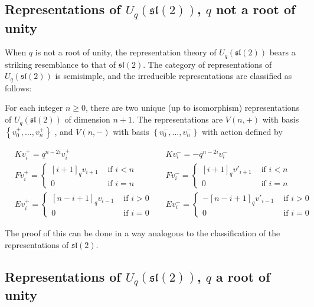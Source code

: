 \documentclass[]{article}
\newcommand{\sll}{\mathfrak{sl}}
\numberwithin{equation}{subsection}
\begin{document}
\subsection{Representations of $U_q(\sll(2))$, $q$ not a root of unity}

When $q$ is not a root of unity, the representation theory of $U_q(\sll(2))$ bears a striking resemblance to that of $\sll(2)$. The category of representations of $U_q(\sll(2))$ is semisimple, and  the irreducible representations are classified as follows:

For each integer $n \geq 0$, there are two unique (up to isomorphism)
representations of $U_q(\sll(2))$ of dimension $n+1$. 
The representations are $V(n,+)$ with basis $\left\{ v^+_0, \ldots, v^+_n \right\}$ , and $V(n,-)$ with basis $\left\{ v^-_0, \ldots, v^-_n \right\}$ with action defined by 

\begin{align*}
    &K v^+_i = q^{n-2i} v^+_i  &
    &K v^-_i = -q^{n-2i} v^-_i \\
    &F v^+_i = \begin{cases} [i+1]_qv_{i+1}& \text{ if $i < n$} \\ 0& \text{ if $i = n$} \end{cases} &
    &F v^-_i = \begin{cases} [i+1]_qv'_{i+1}& \text{ if $i < n$} \\ 0& \text{ if $i = n$} \end{cases} \\
    &E v^+_i = \begin{cases} 
                     [n-i+1]_qv_{i-1}& \text{ if $i > 0$} \\ 
                    0& \text{ if $i = 0$} 
             \end{cases} &
    &E v^-_i = \begin{cases} 
                    -[n-i+1]_q v'_{i-1}& \text{ if $i > 0$} \\ 
                    0& \text{ if $i = 0$} 
             \end{cases}
\end{align*}

The proof of this can be done in a way analogous to the classification of the representations of $\sll(2)$.

\subsection{Representations of $U_q(\sll(2))$, $q$ a root of unity}
\end{document}
